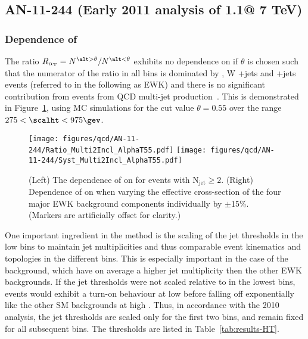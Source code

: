 
\clearpage
\subsection{AN-11-244 (Early 2011 analysis of 1.1\fbinv @ 7 TeV)}

\subsubsection{\scalht Dependence of \RaT  \label{sec:ht-scaling}}

The ratio $\RaT = N^{\alt > \theta}/N^{\alt < \theta}$ exhibits no
dependence on \scalht if $\theta$ is chosen such that the numerator of
the ratio in all \scalht bins is dominated by \ttbar, W +jets and
\znunu +jets events (referred to in the following as EWK) and there is
no significant contribution from events from QCD multi-jet
production~\cite{RA1Paper}. This is demonstrated in
Figure~\ref{fig:rat_vs_ht}, using MC simulations for the cut value
$\theta = 0.55$ over the range $275 < \scalht < 975 \gev$.

\begin{figure}[!h]
  \begin{center}
    \texttt{[image: figures/qcd/AN-11-244/Ratio\_Multi2Incl\_AlphaT55.pdf]}
    \texttt{[image: figures/qcd/AN-11-244/Syst\_Multi2Incl\_AlphaT55.pdf]}
    \caption{\label{fig:rat_vs_ht} (Left) The dependence of \RaT on
      \HT for events with N$_{\mathrm{jet}} \geq 2$. (Right) Dependence of \RaT on
      \HT when varying the effective cross-section of the four major
      EWK background components individually by $\pm$15\%. (Markers
      are artificially offset for clarity.)  }
  \end{center}
\end{figure}

One important ingredient in the \RaT method is the scaling of the jet
\pt thresholds in the low \scalht bins to maintain jet multiplicities
and thus comparable event kinematics and topologies in the different
\scalht bins. This is especially important in the case of the \ttbar
background, which have on average a higher jet multiplicity then the
other EWK backgrounds.  If the jet \pt thresholds were not scaled
relative to \HT in the lowest \HT bins, \ttbar events would exhibit a
turn-on behaviour at low \HT before falling off exponentially like the
other SM backgrounds at high \HT.  Thus, in accordance with the 2010
analysis, the jet \pt thresholds are scaled only for the first two
\scalht bins, and remain fixed for all subsequent bins. The thresholds
are listed in Table~\ref{tab:results-HT}.  

